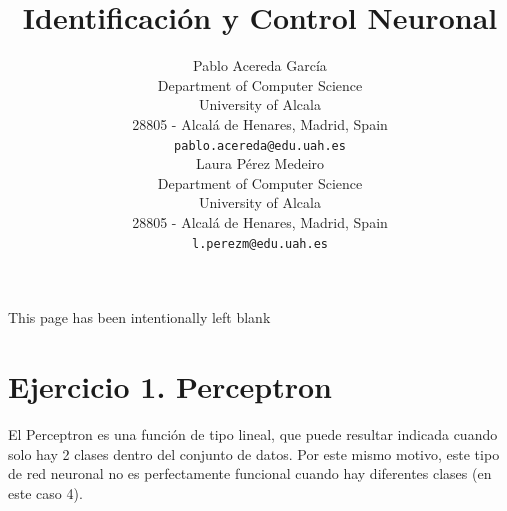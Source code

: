 \documentclass{article}
\title{Identificación y Control Neuronal}
\author{
  Pablo Acereda García\\
  Department of Computer Science\\
  University of Alcala\\
  28805 - Alcalá de Henares, Madrid, Spain \\
  \texttt{pablo.acereda@edu.uah.es} \\
   \And
  Laura Pérez Medeiro\\
  Department of Computer Science\\
  University of Alcala\\
  28805 - Alcalá de Henares, Madrid, Spain \\
  \texttt{l.perezm@edu.uah.es} \\
}
\begin{document}
\maketitle

\newpage
\vspace*{\fill}
 \begin{center}
This page has been intentionally left blank
 \end{center}
\vspace*{\fill}
\newpage

\tableofcontents

\newpage

\section{Ejercicio 1. Perceptron}

El Perceptron es una función de tipo lineal, que puede resultar indicada cuando
solo hay 2 clases dentro del conjunto de datos. Por este mismo motivo, este tipo
de red neuronal no es perfectamente funcional cuando hay diferentes clases (en
este caso 4).
\end{document}
